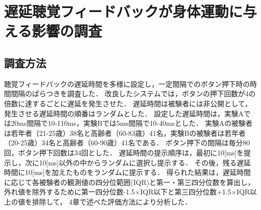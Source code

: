 \section{遅延聴覚フィードバックが身体運動に与える影響の調査}
\subsection{調査方法}
聴覚フィードバックの遅延時間を多様に設定し，一定間隔でのボタン押下時の時間間隔のばらつきを調査した．
改良したシステムでは，ボタンの押下回数が4の倍数に達するごとに遅延を発生させた．
遅延時間は被験者には非公開として，発生させる遅延時間の順番はランダムとした．
設定した遅延時間は，実験Aでは20ms間隔で10-110ms，実験Bでは5ms間隔で10-40msとした．
実験Aの被験者は若年者（21-25歳）38名と高齢者（60-83歳）41名，実験Bの被験者は若年者（20-25歳）34名と高齢者（60-90歳）41名である．
ボタン押下の間隔は毎分80回，ボタン押下回数は34回とした．
遅延時間の提示順序は，最初に10[ms]を提示し，次に10[ms]以外の中からランダムに選択し提示する．
その後，残る遅延時間に10[ms]を加えたものをランダムに提示する．
得られた結果は，遅延時間に応じて各被験者の観測値の四分位範囲(IQR)と第一・第三四分位数を算出し，
外れ値を除外するために第一四分位数-1.5×IQR以下と第三四分位数+1.5×IQR以上の値を排除して，
4章で述べた評価方法により分析した．
